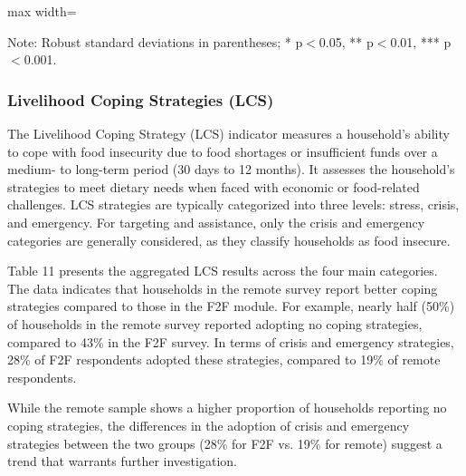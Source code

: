 \documentclass[11pt,harvard]{article}
\begin{document}
	\begin{table}[htbp]
		\centering
		\begin{adjustbox}{max width=\textwidth}
			\begin{threeparttable}
				\caption{Impact of Survey Modality on Reduced Coping Strategy Index Classification}
				\footnotesize
				 
				\label{tab:rCSI_Modality_BF}
				\begin{tablenotes}
					\item Note: Robust standard deviations in parentheses; * p$<$0.05, ** p$<$0.01, *** p$<$0.001.
				\end{tablenotes}
			\end{threeparttable}
		\end{adjustbox}
	\end{table}
	
	
	\subsubsection{Livelihood Coping Strategies (LCS)}
	
The Livelihood Coping Strategy (LCS) indicator measures a household's ability to cope with food insecurity due to food shortages or insufficient funds over a medium- to long-term period (30 days to 12 months). It assesses the household's strategies to meet dietary needs when faced with economic or food-related challenges. LCS strategies are typically categorized into three levels: stress, crisis, and emergency. For targeting and assistance, only the crisis and emergency categories are generally considered, as they classify households as food insecure.

Table 11 presents the aggregated LCS results across the four main categories. The data indicates that households in the remote survey report better coping strategies compared to those in the F2F module. For example, nearly half (50\%) of households in the remote survey reported adopting no coping strategies, compared to 43\% in the F2F survey. In terms of crisis and emergency strategies, 28\% of F2F respondents adopted these strategies, compared to 19\% of remote respondents.

While the remote sample shows a higher proportion of households reporting no coping strategies, the differences in the adoption of crisis and emergency strategies between the two groups (28\% for F2F vs. 19\% for remote) suggest a trend that warrants further investigation.
	
\end{document}
